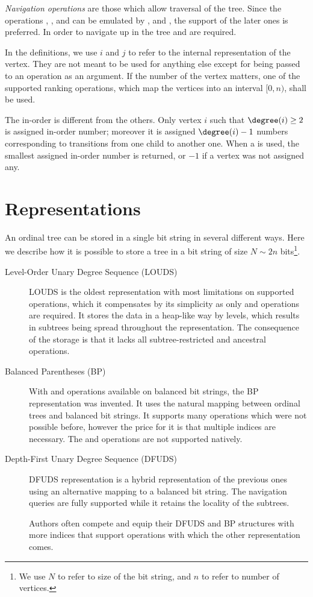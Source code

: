 \emph{Navigation operations} are those which allow traversal of the tree.
Since the operations \childPrev{}, \childNext{}, \childFirst{} and \childLast{} can be emulated by \childRank{}, \childSelect{} and \degree{}, the support of the later ones is preferred.
In order to navigate up in the tree \parent{} and \isRoot{} are required.

In the definitions, we use $i$ and $j$ to refer to the internal representation of the vertex.
They are not meant to be used for anything else except for being passed to an operation as an argument.
If the number of the vertex matters, one of the supported ranking operations, which map the vertices into an interval $[0, n)$, shall be used.

The in-order \rank{} is different from the others.
Only vertex $i$ such that $\degree(i) \ge 2$ is assigned in-order number; moreover it is assigned $\degree(i) - 1$ numbers corresponding to transitions from one child to another one.
When a \inRank{} is used, the smallest assigned in-order number is returned, or $-1$ if a vertex was not assigned any.

\section{Representations}

An ordinal tree can be stored in a single bit string in several different ways.
Here we describe how it is possible to store a tree in a bit string of size $N \sim 2n$ bits\footnote{
	We use $N$ to refer to size of the bit string, and $n$ to refer to number of vertices.
}.
\begin{description}
	\item[Level-Order Unary Degree Sequence (LOUDS)]
	LOUDS is the oldest representation with most limitations on supported operations, which it compensates by its simplicity as only \rank{} and \select{} operations are required.
	It stores the data in a heap-like way by levels, which results in subtrees being spread throughout the representation.
	The consequence of the storage is that it lacks all subtree-restricted and ancestral operations.
	
	\item[Balanced Parentheses (BP)]
	With \match{} and \enclose{} operations available on balanced bit strings, the BP representation was invented.
	It uses the natural mapping between ordinal trees and balanced bit strings.
	It supports many operations which were not possible before, however the price for it is that multiple indices are necessary.
	The \childRank{} and \childSelect{} operations are not supported natively.
	
	\item[Depth-First Unary Degree Sequence (DFUDS)]
	DFUDS representation is a hybrid representation of the previous ones using an alternative mapping to a balanced bit string.
	The navigation queries are fully supported while it retains the locality of the subtrees.
	
	Authors often compete and equip their DFUDS and BP structures with more indices that support operations with which the other representation comes.
\end{description}

